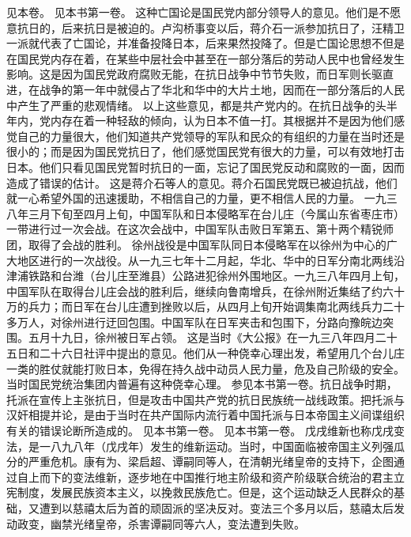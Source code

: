 \begin{maonote}
见本卷。
见本书第一卷。
这种亡国论是国民党内部分领导人的意见。他们是不愿意抗日的，后来抗日是被迫的。卢沟桥事变以后，蒋介石一派参加抗日了，汪精卫一派就代表了亡国论，并准备投降日本，后来果然投降了。但是亡国论思想不但是在国民党内存在着，在某些中层社会中甚至在一部分落后的劳动人民中也曾经发生影响。这是因为国民党政府腐败无能，在抗日战争中节节失败，而日军则长驱直进，在战争的第一年中就侵占了华北和华中的大片土地，因而在一部分落后的人民中产生了严重的悲观情绪。
以上这些意见，都是共产党内的。在抗日战争的头半年内，党内存在着一种轻敌的倾向，认为日本不值一打。其根据并不是因为他们感觉自己的力量很大，他们知道共产党领导的军队和民众的有组织的力量在当时还是很小的；而是因为国民党抗日了，他们感觉国民党有很大的力量，可以有效地打击日本。他们只看见国民党暂时抗日的一面，忘记了国民党反动和腐败的一面，因而造成了错误的估计。
这是蒋介石等人的意见。蒋介石国民党既已被迫抗战，他们就一心希望外国的迅速援助，不相信自己的力量，更不相信人民的力量。
一九三八年三月下旬至四月上旬，中国军队和日本侵略军在台儿庄（今属山东省枣庄市）一带进行过一次会战。在这次会战中，中国军队击败日军第五、第十两个精锐师团，取得了会战的胜利。
徐州战役是中国军队同日本侵略军在以徐州为中心的广大地区进行的一次战役。从一九三七年十二月起，华北、华中的日军分南北两线沿津浦铁路和台潍（台儿庄至潍县）公路进犯徐州外围地区。一九三八年四月上旬，中国军队在取得台儿庄会战的胜利后，继续向鲁南增兵，在徐州附近集结了约六十万的兵力；而日军在台儿庄遭到挫败以后，从四月上旬开始调集南北两线兵力二十多万人，对徐州进行迂回包围。中国军队在日军夹击和包围下，分路向豫皖边突围。五月十九日，徐州被日军占领。
这是当时《大公报》在一九三八年四月二十五日和二十六日社评中提出的意见。他们从一种侥幸心理出发，希望用几个台儿庄一类的胜仗就能打败日本，免得在持久战中动员人民力量，危及自己阶级的安全。当时国民党统治集团内普遍有这种侥幸心理。
参见本书第一卷。抗日战争时期，托派在宣传上主张抗日，但是攻击中国共产党的抗日民族统一战线政策。把托派与汉奸相提并论，是由于当时在共产国际内流行着中国托派与日本帝国主义间谍组织有关的错误论断所造成的。
见本书第一卷。
见本书第一卷。
戊戌维新也称戊戌变法，是一八九八年（戊戌年）发生的维新运动。当时，中国面临被帝国主义列强瓜分的严重危机。康有为、梁启超、谭嗣同等人，在清朝光绪皇帝的支持下，企图通过自上而下的变法维新，逐步地在中国推行地主阶级和资产阶级联合统治的君主立宪制度，发展民族资本主义，以挽救民族危亡。但是，这个运动缺乏人民群众的基础，又遭到以慈禧太后为首的顽固派的坚决反对。变法三个多月以后，慈禧太后发动政变，幽禁光绪皇帝，杀害谭嗣同等六人，变法遭到失败。

\end{maonote}
